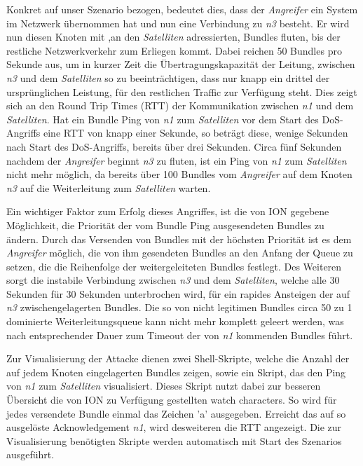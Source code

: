 \documentclass{article}
\begin{document}
Konkret auf unser Szenario bezogen, bedeutet dies, dass der \textit{Angreifer} ein System im Netzwerk übernommen hat und nun eine Verbindung zu \textit{n3} besteht. Er wird nun diesen Knoten mit ,an den \textit{Satelliten} adressierten, Bundles fluten, bis  der restliche Netzwerkverkehr zum Erliegen kommt. Dabei reichen 50 Bundles pro Sekunde aus, um in kurzer Zeit die Übertragungskapazität der Leitung, zwischen \textit{n3} und dem \textit{Satelliten} so zu beeinträchtigen, dass nur knapp ein drittel der ursprünglichen Leistung, für den restlichen Traffic zur Verfügung steht. Dies zeigt sich an den Round Trip Times (RTT) der Kommunikation zwischen \textit{n1} und dem \textit{Satelliten}. Hat ein Bundle Ping von \textit{n1} zum \textit{Satelliten} vor dem Start des DoS-Angriffs eine RTT von knapp einer Sekunde, so beträgt diese, wenige Sekunden nach Start des DoS-Angriffs, bereits über drei Sekunden. Circa fünf Sekunden nachdem der \textit{Angreifer} beginnt \textit{n3} zu fluten, ist ein Ping von \textit{n1} zum \textit{Satelliten} nicht mehr möglich, da bereits über 100 Bundles vom \textit{Angreifer} auf dem Knoten \textit{n3} auf die Weiterleitung zum \textit{Satelliten} warten.\par
Ein wichtiger Faktor zum Erfolg dieses Angriffes, ist die von ION gegebene Möglichkeit, die Priorität der vom Bundle Ping ausgesendeten Bundles zu ändern. Durch das Versenden von Bundles mit der höchsten Priorität ist es dem \textit{Angreifer} möglich, die von ihm gesendeten Bundles an den Anfang der Queue zu setzen, die die Reihenfolge der weitergeleiteten Bundles festlegt. Des Weiteren sorgt die instabile Verbindung zwischen \textit{n3} und dem \textit{Satelliten}, welche alle 30 Sekunden für 30 Sekunden unterbrochen wird, für ein rapides Ansteigen der auf \textit{n3} zwischengelagerten Bundles. Die so von nicht legitimen Bundles circa 50 zu 1 dominierte Weiterleitungsqueue kann nicht mehr komplett geleert werden, was nach entsprechender Dauer zum Timeout der von \textit{n1} kommenden Bundles führt. \par
Zur Visualisierung der Attacke dienen zwei Shell-Skripte, welche  die Anzahl der auf jedem Knoten eingelagerten Bundles zeigen, sowie ein Skript, das den Ping von \textit{n1} zum \textit{Satelliten} visualisiert. Dieses Skript nutzt dabei zur besseren Übersicht die von ION zu Verfügung gestellten watch characters. So wird für jedes versendete Bundle einmal das Zeichen 'a' ausgegeben. Erreicht das auf so ausgelöste Acknowledgement \textit{n1}, wird desweiteren die RTT angezeigt. Die zur Visualisierung benötigten Skripte werden automatisch mit Start des Szenarios ausgeführt.
\end{document}
